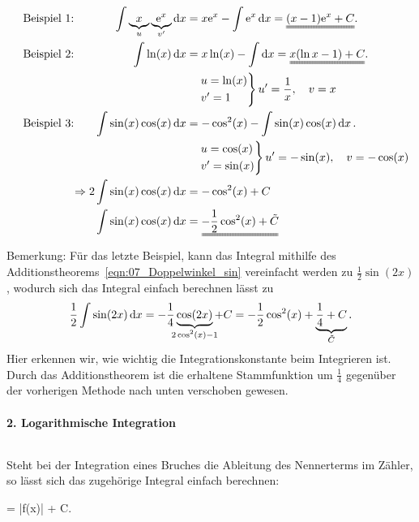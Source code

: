 \begin{alignat}{3}
    &\qq{Beispiel 1:}& \int \underbrace{x}_{u} \underbrace{\e^{x}}_{v'} \dd{x}  &= x \e^x - \int \e^x \dd{x} = \uuline{(x-1) \e^x + C}.\\
    &\qq{Beispiel 2:}& \int \ln(x) \dd{x} &= x \ln(x) - \int \dd{x} = \uuline{x(\ln x -1) + C}. \\
    & &&\quad\begin{rcases}
        u = \ln(x) \\ v' = 1 
    \end{rcases} u' = \frac{1}{x}, \quad v= x \notag \\
    &\qq{Beispiel 3:}& \int \sin(x)\cos(x) \dd{x} &= -\cos^2(x) - \int \sin(x) \cos(x) \dd{x}. \notag \\
    & &&\quad \begin{rcases}
        u = \cos(x) \\ v' = \sin(x) 
    \end{rcases} u' = -\sin(x), \quad v= -\cos(x) \notag \\
    & &\hspace{-1cm}\Rightarrow 2 \int \sin(x) \cos(x) \dd{x} &= -\cos^2(x) + C \notag \\
    & &            \int \sin(x) \cos(x) \dd{x} &= \uuline{-\frac{1}{2}\cos^2(x) + \tilde{C}}
\end{alignat}
Bemerkung: Für das letzte Beispiel, kann das Integral mithilfe des Additionstheorems~\eqref{eqn:07_Doppelwinkel_sin} vereinfacht werden zu $\frac{1}{2}\sin(2x)$, wodurch sich das Integral einfach berechnen lässt zu 
\begin{align}
    \frac{1}{2}\int \sin(2x) \dd{x} = -\frac{1}{4} \underbrace{\cos(2x)}_{\mathclap{2 \cos^2(x) -1}} + C  = -\frac{1}{2} \cos^2(x) + \underbrace{\frac{1}{4} + C}_{\tilde{C}}.
\end{align}
Hier erkennen wir, wie wichtig die Integrationskonstante beim Integrieren ist. Durch das Additionstheorem ist die erhaltene Stammfunktion um $\frac{1}{4}$ gegenüber der vorherigen Methode nach unten verschoben gewesen.

\paragraph{2. Logarithmische Integration}$~$

Steht bei der Integration eines Bruches die Ableitung des Nennerterms im Zähler, so lässt sich das zugehörige Integral einfach berechnen: 
\begin{mymathbox}[ams align, title={Logarithmische Integration}, colframe={FSUblau}]
    \int {}  = \ln|f(x)| + C.
\end{mymathbox}

